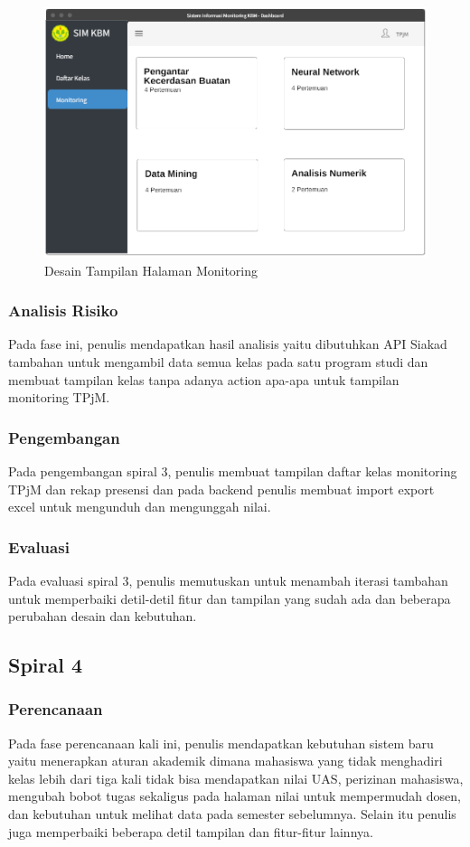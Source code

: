 \begin{figure}[h!]
	\centering
	\includegraphics[width=1\textwidth]{gambar/mockup/monitoring}
	\caption{Desain Tampilan Halaman Monitoring}
	\label{fig:mockmonitoring}
\end{figure}

\subsubsection{Analisis Risiko}
	Pada fase ini, penulis mendapatkan hasil analisis yaitu dibutuhkan API Siakad tambahan untuk mengambil data semua kelas pada satu program studi dan membuat tampilan kelas tanpa adanya action apa-apa untuk tampilan monitoring TPjM.
\subsubsection{Pengembangan}
	Pada pengembangan spiral 3, penulis membuat tampilan daftar kelas monitoring TPjM dan rekap presensi dan pada backend penulis membuat import export excel untuk mengunduh dan mengunggah nilai.
\subsubsection{Evaluasi}
	Pada evaluasi spiral 3, penulis memutuskan untuk menambah iterasi tambahan untuk memperbaiki detil-detil fitur dan tampilan yang sudah ada dan beberapa perubahan desain dan kebutuhan.

\subsection{Spiral 4}		%
\subsubsection{Perencanaan}
	Pada fase perencanaan kali ini, penulis mendapatkan kebutuhan sistem baru yaitu menerapkan aturan akademik dimana mahasiswa yang tidak menghadiri kelas lebih dari tiga kali tidak bisa mendapatkan nilai UAS, perizinan mahasiswa, mengubah bobot tugas sekaligus pada halaman nilai untuk mempermudah dosen, dan kebutuhan untuk melihat data pada semester sebelumnya. Selain itu penulis juga memperbaiki beberapa detil tampilan dan fitur-fitur lainnya.


